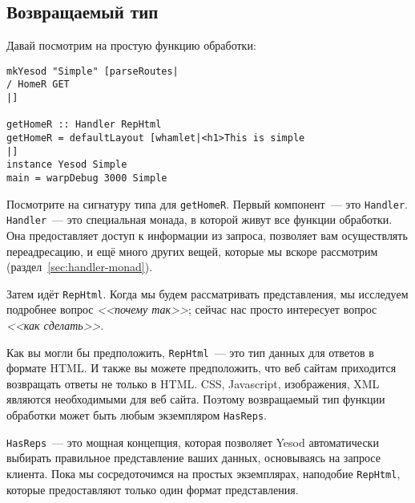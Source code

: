 \subsection{Возвращаемый тип}
Давай посмотрим на простую функцию обработки:
\begin{lstlisting}
mkYesod "Simple" [parseRoutes|
/ HomeR GET
|]

getHomeR :: Handler RepHtml
getHomeR = defaultLayout [whamlet|<h1>This is simple
|]
instance Yesod Simple
main = warpDebug 3000 Simple
\end{lstlisting}

Посмотрите на сигнатуру типа для \lstinline!getHomeR!. Первый
компонент~--- это \lstinline!Handler!. \lstinline!Handler!~--- это
специальная монада, в которой живут все функции обработки. Она
предоставляет доступ к информации из запроса, позволяет вам
осуществлять переадресацию, и ещё много других вещей, которые мы
вскоре рассмотрим (раздел~\ref{sec:handler-monad}).

Затем идёт \lstinline!RepHtml!. Когда мы будем рассматривать
представления,
мы исследуем подробнее вопрос \emph{<<почему так>>}; сейчас
нас просто интересует вопрос \emph{<<как сделать>>}.

Как вы могли бы предположить, \lstinline!RepHtml!~--- это тип данных
для ответов в формате HTML. И также вы можете предположить, что веб
сайтам приходится возвращать ответы не только в HTML. CSS, Javascript,
изображения, XML являются необходимыми для веб сайта. Поэтому
возвращаемый тип функции обработки может быть любым экземпляром
\lstinline!HasReps!.

\lstinline!HasReps!~--- это мощная концепция, которая позволяет Yesod
автоматически выбирать правильное представление ваших данных,
основываясь на запросе клиента. Пока мы сосредоточимся на простых
экземплярах, наподобие \lstinline!RepHtml!, которые предоставляют
только один формат представления.

